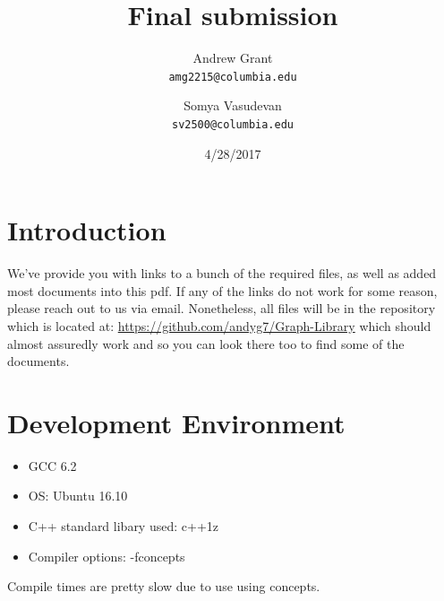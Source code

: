 \documentclass{article}
\title{Final submission}
\author{
Andrew Grant\\
\texttt{amg2215@columbia.edu}
\and
 Somya Vasudevan \\
 \texttt{sv2500@columbia.edu}
}
\date{4/28/2017}
\begin{document}
\maketitle

\tableofcontents

\section{Introduction}
We've provide you with links to a bunch of the required files, as well as added most documents into this pdf. If any of the links do not work for some reason, please reach out to us via email. Nonetheless, all files will be in the repository which is located at:  \url{https://github.com/andyg7/Graph-Library} which should almost assuredly work and so you can look there too to find some of the documents.
\par
\section{Development Environment}
\begin{itemize}
\item GCC 6.2
\item OS: Ubuntu 16.10
\item C++ standard libary used: c++1z
\item Compiler options: -fconcepts
\end{itemize}
Compile times are pretty slow due to use using concepts.
\end{document}
